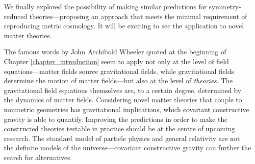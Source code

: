 We finally explored the possibility of making similar predictions for symmetry-reduced theories---proposing an approach that meets the minimal requirement of reproducing metric cosmology. It will be exciting to see the application to novel matter theories.

The famous words by John Archibald Wheeler quoted at the beginning of Chapter \ref{chapter_introduction} seem to apply not only at the level of field equations---matter fields source gravitational fields, while gravitational fields determine the motion of matter fields---but also at the level of \emph{theories}. The gravitational field equations themselves are, to a certain degree, determined by the dynamics of matter fields. Considering novel matter theories that couple to nonmetric geometries has gravitational implications, which covariant constructive gravity is able to quantify. Improving the predictions in order to make the constructed theories testable in practice should be at the centre of upcoming research. The standard model of particle physics and general relativity are not the definite models of the universe---covariant constructive gravity can further the search for alternatives.
